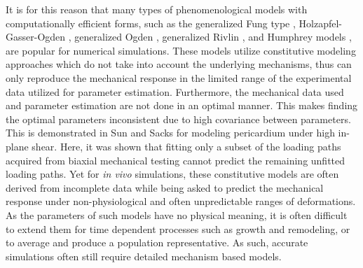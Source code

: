    It is for this reason that many types of phenomenological models with computationally efficient forms, such as the generalized Fung type \cite{fung_biomechanics_1993}, Holzapfel-Gasser-Ogden \cite{holzapfel_new_2000}, generalized Ogden \cite{ogden_large_1972}, generalized Rivlin \cite{rivlin_large_1951}, and Humphrey models \cite{may-newman_constitutive_1998}, are popular for numerical simulations. These models utilize constitutive modeling approaches which do not take into account the underlying mechanisms, thus can only reproduce the mechanical response in the limited range of the experimental data utilized for parameter estimation. Furthermore, the mechanical data used and parameter estimation are not done in an optimal manner. This makes finding the optimal parameters inconsistent due to high covariance between parameters. This is demonstrated in Sun and Sacks \cite{sun_biaxial_2003} for modeling pericardium under high in-plane shear. Here, it was shown that fitting only a subset of the loading paths acquired from biaxial mechanical testing cannot predict the remaining unfitted loading paths. Yet for \textit{in vivo} simulations, these constitutive models are often derived from incomplete data while being asked to predict the mechanical response under non-physiological and often unpredictable ranges of deformations. As the parameters of such models have no physical meaning, it is often difficult to extend them for time dependent processes such as growth and remodeling, or to average and produce a population representative. As such, accurate simulations often still require detailed mechanism based models. 
    

    
